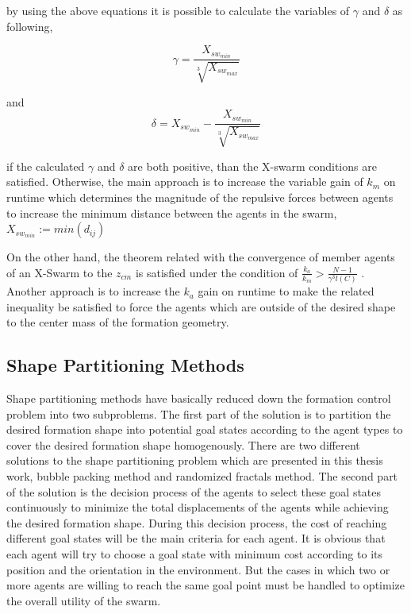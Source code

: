by using the above equations it is possible to calculate the variables of $\gamma$ and $\delta$ as following,

\begin{equation}
\gamma = \frac{ X_{sw_{min}}}{\sqrt[3]{ X_{sw_{max}}}}
\end{equation}
			
and
\begin{equation}
\delta =  X_{sw_{min}} - \frac{ X_{sw_{min}}}{\sqrt[3]{ X_{sw_{max}}}}
\end{equation}

if the calculated  $\gamma$ and $\delta$ are both positive, than the X-swarm conditions are satisfied. Otherwise, the main approach is to increase the variable gain of $k_m$ on runtime which determines the magnitude of the repulsive forces between agents to increase the minimum distance between the agents in the swarm, $X_{sw_{min}} := min(d_{ij})$
			
On the other hand, the theorem related with the convergence of member agents of an X-Swarm to the $z_{cm}$ is satisfied under the condition of $\frac{k_a}{k_m} > \frac{N-1}{\gamma^3  l(C)}$ . Another approach is to increase the $k_a$ gain on runtime to make the related inequality be satisfied to force the agents which are outside of the desired shape to the center mass of the formation geometry. 
					
\subsection{Shape Partitioning Methods}
Shape partitioning methods have basically reduced down the formation control problem into two subproblems. The first part of the solution is to partition the desired formation shape into potential goal states according to the agent types to cover the desired formation shape homogenously. There are two different solutions to the shape partitioning problem which are presented in this thesis work, bubble packing method and randomized fractals method. The second part of the solution is the decision process of the agents to select these goal states continuously to minimize the total displacements of the agents while achieving the desired formation shape. During this decision process, the cost of reaching different goal states will be the main criteria for each agent. It is obvious that each agent will try to choose a goal state with minimum cost according to its position and the orientation in the environment. But the cases in which two or more agents are willing to reach the same goal point must be handled to optimize the overall utility of the swarm. 

